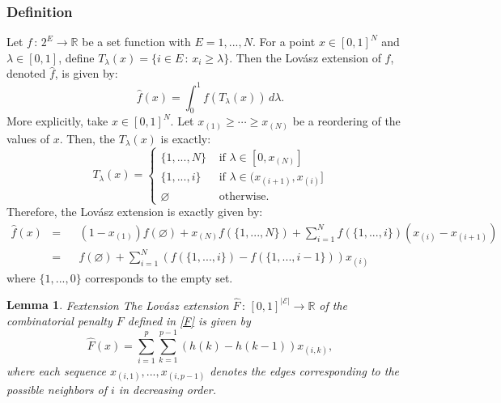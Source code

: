 \documentclass{uwstat572}
\newtheorem{lemma}[theorem]{Lemma}
\theoremstyle{remark}
\theoremstyle{definition}
\begin{document}
\subsubsection{Definition}
Let $f \, : \, 2^E \to \mathbb{R}$ be a set function with $E = {1,...,N}$.  For a point $x \in [0,1]^N$ and $\lambda \in [0,1]$, define $T_{\lambda}(x) = \{i \in E \, : \, x_i \geq \lambda\}$.  Then the Lov{\'a}sz extension of $f$, denoted $\hat{f}$, is given by:
\begin{equation*}
\hat{f}(x) = \int_{0}^1 f( T_{\lambda}(x)) \, d\lambda.
\end{equation*}
More explicitly, take $x \in [0,1]^N$.  Let $x_{(1)} \geq \cdots \geq x_{(N)}$ be a reordering of the values of $x$.  Then, the $T_{\lambda}(x)$ is exactly:
\begin{equation*}
T_{\lambda}(x) = \begin{cases}
\{1,...,N\} & {\text{ if }} \lambda \in [0,x_{(N)}]
\\
\{1,...,i\} & {\text{ if }} \lambda \in (x_{(i+1)}, x_{(i)}]
\\
\varnothing & {\text{ otherwise}}.
\end{cases}
\end{equation*}
Therefore, the Lov{\'a}sz extension is exactly given by:
\begin{equation}\label{lovasz}
\begin{aligned}
\hat{f}(x) &= &&(1-x_{(1)}) f( \varnothing) + x_{(N)} f(\{1,...,N\})+ \sum_{i=1}^N f(\{1,...,i\})(x_{(i)} - x_{(i+1)}) 
\\
&= && f(\varnothing) + \sum_{i=1}^N (f(\{1,...,i\}) - f(\{1,...,i-1\})) x_{(i)}
\end{aligned}
\end{equation}
where $\{1,...,0\}$ corresponds to the empty set.

\begin{lemma}{Fextension}
The Lov{\'a}sz extension $\hat{F} \, : \, [0,1]^{|\mathcal{E}|} \to \mathbb{R}$ of the combinatorial penalty $F$ defined in \eqref{F} is given by
\begin{equation}
\hat{F}(x) = \sum_{i=1}^p \sum_{k=1}^{p-1} (h(k) - h(k-1)) x_{(i,k)},
\end{equation}
where each sequence $x_{(i,1)},...,x_{(i,p-1)}$ denotes the edges corresponding to the possible neighbors of $i$ in decreasing order.
\end{lemma}
\end{document}
